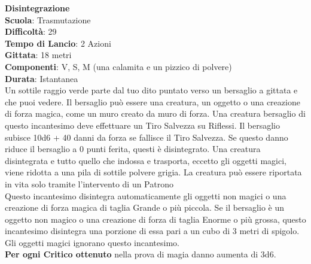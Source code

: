 \begin{multicols}{2}
\medskip\textbf{Disintegrazione}\\
\textbf{Scuola}: Trasmutazione\\
\textbf{Difficoltà}: 29\\
\textbf{Tempo di Lancio}: 2 Azioni\\
\textbf{Gittata}: 18 metri\\
\textbf{Componenti}: V, S, M (una calamita e un pizzico di polvere)\\
\textbf{Durata}: Istantanea\\
Un sottile raggio verde parte dal tuo dito puntato verso un bersaglio a gittata e che puoi vedere. Il bersaglio può essere una creatura, un oggetto o una creazione di forza magica, come un muro creato da muro di forza. Una creatura bersaglio di questo incantesimo deve effettuare un Tiro Salvezza su Riflessi. Il bersaglio subisce 10d6 + 40 danni da forza se fallisce il Tiro Salvezza. Se questo danno riduce il bersaglio a 0 punti ferita, questi è disintegrato. Una creatura disintegrata e tutto quello che indossa e trasporta, eccetto gli oggetti magici, viene ridotta a una pila di sottile polvere grigia. La creatura può essere riportata in vita solo tramite l'intervento di un Patrono\\
Questo incantesimo disintegra automaticamente gli oggetti non magici o una creazione di forza magica di taglia Grande o più piccola. Se il bersaglio è un oggetto non magico o una creazione di forza di taglia Enorme o più grossa, questo incantesimo disintegra una porzione di essa pari a un cubo di 3 metri di spigolo. Gli oggetti magici ignorano questo incantesimo.\\
\textbf{Per ogni Critico ottenuto} nella prova di magia danno aumenta di 3d6.


\end{multicols}
